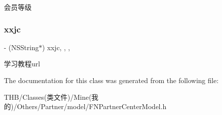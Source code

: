 会员等级 \mbox{\label{interface_f_n_partner_center_model_adc749d6d3c607bcbbb0d992b58f86584}} 
\subsubsection{\texorpdfstring{xxjc}{xxjc}}
{\footnotesize\ttfamily -\/ (N\+S\+String$\ast$) xxjc\hspace{0.3cm}{\ttfamily [read]}, {\ttfamily [write]}, {\ttfamily [nonatomic]}, {\ttfamily [copy]}}

学习教程url 

The documentation for this class was generated from the following file\+:\begin{DoxyCompactItemize}
\item 
T\+H\+B/\+Classes(类文件)/\+Mine(我的)/\+Others/\+Partner/model/F\+N\+Partner\+Center\+Model.\+h\end{DoxyCompactItemize}
